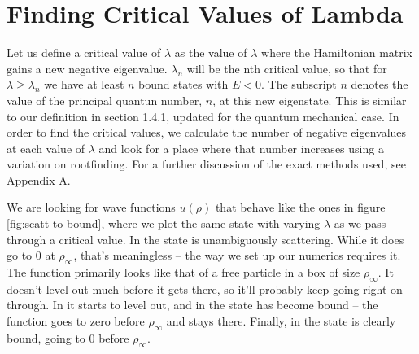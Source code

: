 \documentclass[12pt,twoside]{reedthesis}
\begin{document}
\section{Finding Critical Values of Lambda}
Let us define a critical value of $\lambda$ as the value of $\lambda$ where the Hamiltonian matrix gains a new negative eigenvalue. $\lambda_n$ will be the nth critical value, so that for $\lambda \geq \lambda_n$ we have at least $n$ bound states with $E < 0$. The subscript $n$ denotes the value of the principal quantun number, $n$, at this new eigenstate. This is similar to our definition in section 1.4.1, updated for the quantum mechanical case.
In order to find the critical values, we calculate the number of negative eigenvalues at each value of $\lambda$ and look for a place where that number increases using a variation on rootfinding. For a further discussion of the exact methods used, see Appendix A.

We are looking for wave functions $u(\rho)$ that behave like the ones in figure \ref{fig:scatt-to-bound}, where we plot the same state with varying $\lambda$ as we pass through a critical value. In  the state is unambiguously scattering. While it does go to 0 at $\rho_{\infty}$, that's meaningless -- the way we set up our numerics requires it.
The function primarily looks like that of a free particle in a box of size $\rho_{\infty}$. 
 It doesn't level out much before it gets there, so it'll probably keep going right on through. In  it starts to level out, and in  the state has become bound -- the function goes to zero before $\rho_{\infty}$ and stays there. Finally, in  the state is clearly bound, going to 0 before $\rho_{\infty}$. 
\end{document}
